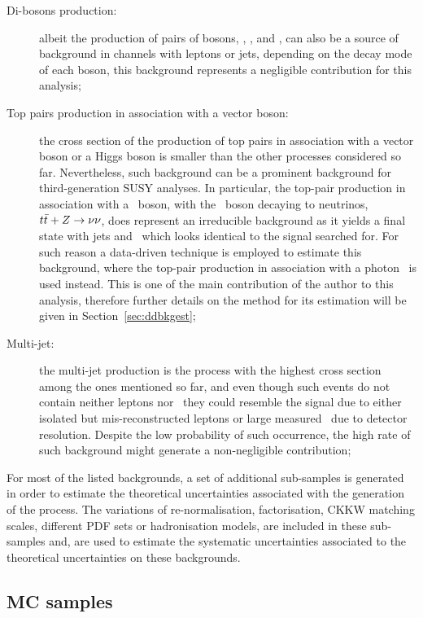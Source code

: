 \begin{description}
			\item [Di-bosons production:] albeit the production of pairs of bosons, \Wboson\Wboson, \Wboson\Zboson, and \Zboson\Zboson, can also be a source of background in channels with leptons or jets, depending on the decay mode of each boson, this background represents a negligible contribution for this analysis;

			\item [Top pairs production in association with a vector boson:] the cross section of the production of top pairs in association with a vector boson or a Higgs boson is smaller than the other processes considered so far. Nevertheless, such background can be a prominent background for third-generation \ac{SUSY} analyses. In particular, the top-pair production in association with a \Zboson\ boson, with the \Zboson\ boson decaying to neutrinos, $t\bar{t}+Z \rightarrow \nu \nu$, does represent an irreducible background as it yields a final state with jets and \met\ which looks identical to the signal searched for. For such reason a data-driven technique is employed to estimate this background, where the top-pair production in association with a photon \ttgamma\ is used instead. This is one of the main contribution of the author to this analysis, therefore further details on the method for its estimation will be given in Section~\ref{sec:ddbkgest}; 

			\item [Multi-jet:] the multi-jet production is the process with the highest cross section among the ones mentioned so far, and even though such events do not contain neither leptons nor \met\ they could resemble the signal due to either isolated but mis-reconstructed leptons or large measured \met\ due to detector resolution. Despite the low probability of such occurrence, the high rate of such background might generate a non-negligible contribution;
		\end{description}

		\noindent For most of the listed backgrounds, a set of additional sub-samples is generated in order to estimate the theoretical uncertainties associated with the generation of the process. The variations of re-normalisation, factorisation, \ac{CKKW} matching scales, different \ac{PDF} sets or hadronisation models, are included in these sub-samples and, are used to estimate the systematic uncertainties associated to the theoretical uncertainties on these backgrounds.

		\subsection{MC samples}
		\label{subsec:mc_samples}

